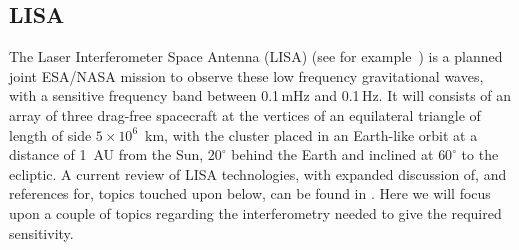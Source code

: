 \documentclass{article}
\begin{document}
\subsection{LISA}
The Laser Interferometer Space Antenna (LISA) (see for example~\cite{LISAsymposium,
NASAweb, ESAweb}) is a planned joint ESA/NASA mission to observe these low frequency
gravitational waves, with a sensitive frequency band between 0.1\,mHz and
0.1\,Hz. It will consists of an array of three drag-free spacecraft at the vertices
of an equilateral triangle of length of side $5\times10^6$~km, with the cluster 
placed in an Earth-like orbit at a distance of 1~AU from the Sun,
$20^{\circ}$ behind the Earth and inclined at $60^{\circ}$ to the ecliptic. A
current review of LISA technologies, with expanded discussion of, and references
for, topics touched upon below, can be found in \cite{Jennrich:2009}. Here we
will focus upon a couple of topics regarding the interferometry needed to give
the required sensitivity.
\end{document}
